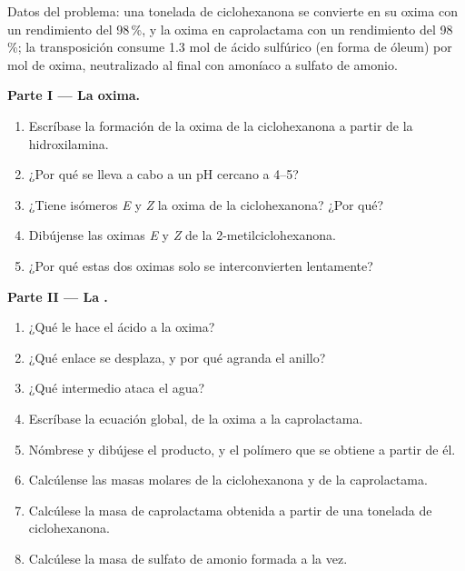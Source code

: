 \begin{problem}
\label{pb:b3:radicals-carbenes:1}
Datos del problema: una tonelada de ciclohexanona se convierte en su oxima con un
rendimiento del 98\,\%, y la oxima en caprolactama con un rendimiento del 98\,\%; la transposición consume
1.3 mol de ácido sulfúrico (en forma de óleum) por mol de oxima, neutralizado al final con
amoníaco a sulfato de amonio.

\medskip\noindent\textbf{Parte I --- La oxima.}
\begin{enumerate}
  \item Escríbase la formación de la oxima de la ciclohexanona a partir de la hidroxilamina.
  \item ¿Por qué se lleva a cabo a un pH cercano a 4--5?
  \item ¿Tiene isómeros \textit{E} y \textit{Z} la oxima de la ciclohexanona? ¿Por qué?
  \item Dibújense las oximas \textit{E} y \textit{Z} de la 2-metilciclohexanona.
  \item ¿Por qué estas dos oximas solo se interconvierten lentamente?
\end{enumerate}

\medskip\noindent\textbf{Parte II --- La .}
\begin{enumerate}[resume]
  \item ¿Qué le hace el ácido a la oxima?
  \item ¿Qué enlace se desplaza, y por qué agranda el anillo?
  \item ¿Qué intermedio ataca el agua?
  \item Escríbase la ecuación global, de la oxima a la caprolactama.
  \item Nómbrese y dibújese el producto, y el polímero que se obtiene a partir de él.
  \item Calcúlense las masas molares de la ciclohexanona y de la caprolactama.
  \item Calcúlese la masa de caprolactama obtenida a partir de una tonelada de ciclohexanona.
  \item Calcúlese la masa de sulfato de amonio formada a la vez.
\end{enumerate}


\end{problem}
